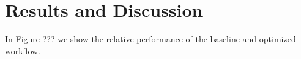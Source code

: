 \documentclass[a4paper, 10pt, conference]{ieeeconf}
\makeatletter
\newcommand{\specialcell}[2][c]{%
  \begin{tabular}[#1]{@{}c@{}}#2\end{tabular}}
\makeatother
\begin{document}

\section{Results and Discussion}

In Figure ??? we show the relative performance of the baseline and optimized workflow.
\end{document}
